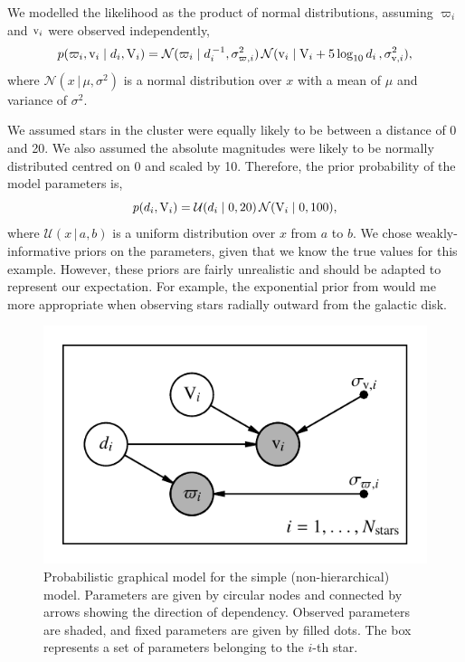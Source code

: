 We modelled the likelihood as the product of normal distributions, assuming \(\varpi_i\) and \(\mathrm{v}_i\) were observed independently,
%
\begin{equation}
    p(\varpi_i, \mathrm{v}_i \mid d_i, \mathrm{V}_i) = \mathcal{N}(\varpi_i \mid d_i^{\,-1}, \sigma_{\varpi, i}^2) \, \mathcal{N}(\mathrm{v}_i \mid \mathrm{V}_i + 5\log_{10}d_i \, , \sigma_{\mathrm{v}, i}^2),\label{eq:hbm-like}
\end{equation}
%
where \(\mathcal{N}(x \,|\, \mu, \sigma^2)\) is a normal distribution over \(x\) with a mean of \(\mu\) and variance of \(\sigma^2\).

We assumed stars in the cluster were equally likely to be between a distance of 0 and 20. We also assumed the absolute magnitudes were likely to be normally distributed centred on 0 and scaled by 10. Therefore, the prior probability of the model parameters is,
%
\begin{equation}
    p(d_i, \mathrm{V}_i) = \mathcal{U}(d_i \mid 0, 20) \, \mathcal{N}(\mathrm{V}_i \mid 0, 100),
\end{equation}
%
where \(\mathcal{U}(x \,|\, a, b)\) is a uniform distribution over \(x\) from \(a\) to \(b\). We chose weakly-informative priors on the parameters, given that we know the true values for this example. However, these priors are fairly unrealistic and should be adapted to represent our expectation. For example, the exponential prior from \citet{Bailer-Jones.Rybizki.ea2018} would me more appropriate when observing stars radially outward from the galactic disk.

\begin{figure}[tb]
    \centering
    \includegraphics{figures/simple-pgm.pdf}
    \caption{Probabilistic graphical model for the simple (non-hierarchical) model. Parameters are given by circular nodes and connected by arrows showing the direction of dependency. Observed parameters are shaded, and fixed parameters are given by filled dots. The box represents a set of parameters belonging to the \(i\)-th star.}
    \label{fig:simple-pgm}
\end{figure}

